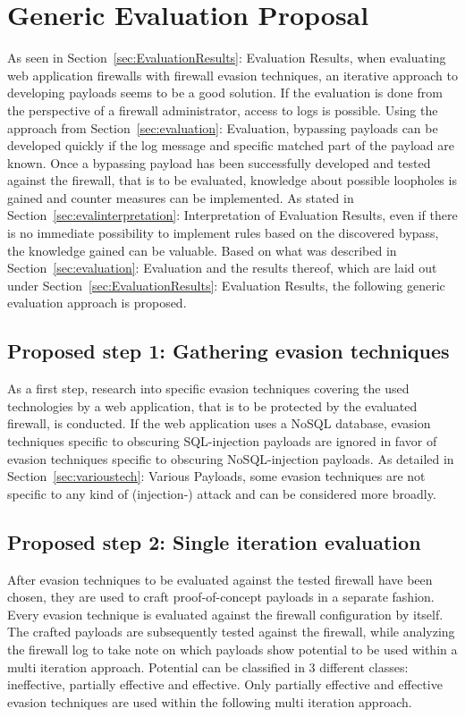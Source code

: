 \section{Generic Evaluation Proposal}
\label{sec:proposal}
As seen in Section~\ref{sec:EvaluationResults}: Evaluation Results, when evaluating web application firewalls with firewall evasion techniques, an iterative approach to developing payloads seems to be a good solution. If the evaluation is done from the perspective of a firewall administrator, access to logs is possible. Using the approach from Section~\ref{sec:evaluation}: Evaluation, bypassing payloads can be developed quickly if the log message and specific matched part of the payload are known.
Once a bypassing payload has been successfully developed and tested against the firewall, that is to be evaluated, knowledge about possible loopholes is gained and counter measures can be implemented. As stated in Section~\ref{sec:evalinterpretation}: Interpretation of Evaluation Results, even if there is no immediate possibility to implement rules based on the discovered bypass, the knowledge gained can be valuable. Based on what was described in Section~\ref{sec:evaluation}: Evaluation and the results thereof, which are laid out under Section~\ref{sec:EvaluationResults}: Evaluation Results, the following generic evaluation approach is proposed.

\subsection{Proposed step 1: Gathering evasion techniques}
As a first step, research into specific evasion techniques covering the used technologies by a web application, that is to be protected by the evaluated firewall, is conducted. If the web application uses a NoSQL database, evasion techniques specific to obscuring SQL-injection payloads are ignored in favor of evasion techniques specific to obscuring NoSQL-injection payloads. As detailed in Section~\ref{sec:varioustech}: Various Payloads, some evasion techniques are not specific to any kind of (injection-) attack and can be considered more broadly.

\subsection{Proposed step 2: Single iteration evaluation}
After evasion techniques to be evaluated against the tested firewall have been chosen, they are used to craft proof-of-concept payloads in a separate fashion. Every evasion technique is evaluated against the firewall configuration by itself. The crafted payloads are subsequently tested against the firewall, while analyzing the firewall log to take note on which payloads show potential to be used within a multi iteration approach. Potential can be classified in 3 different classes: ineffective, partially effective and effective. Only partially effective and effective evasion techniques are used within the following multi iteration approach.

